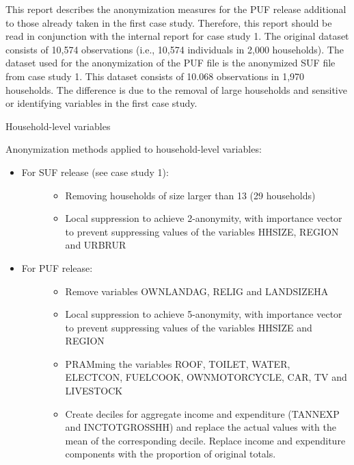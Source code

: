 \documentclass[letterpaper,10pt,english]{sphinxmanual}
\begin{document}
This report describes the anonymization measures for the PUF release additional to those already taken in the first case study. Therefore, this report should be read in conjunction with the internal report for case study 1. The original dataset consists of 10,574 observations (i.e., 10,574 individuals in 2,000 households). The dataset used for the anonymization of the PUF file is the anonymized SUF file from case study 1. This dataset consists of 10.068 observations in 1,970 households. The difference is due to the removal of large households and sensitive or identifying variables in the first case study.

Household-level variables

Anonymization methods applied to household-level variables:
\begin{itemize}
\item {} \begin{description}
\item[{For SUF release (see case study 1):}] \leavevmode\begin{itemize}
\item {} 
Removing households of size larger than 13 (29 households)

\item {} 
Local suppression to achieve 2-anonymity, with importance vector to prevent suppressing values of the variables HHSIZE, REGION and URBRUR

\end{itemize}

\end{description}

\item {} \begin{description}
\item[{For PUF release:}] \leavevmode\begin{itemize}
\item {} 
Remove variables OWNLANDAG, RELIG and LANDSIZEHA

\item {} 
Local suppression to achieve 5-anonymity, with importance vector to prevent suppressing values of the variables HHSIZE and REGION

\item {} 
PRAMming the variables ROOF, TOILET, WATER, ELECTCON, FUELCOOK, OWNMOTORCYCLE, CAR, TV and LIVESTOCK

\item {} 
Create deciles for aggregate income and expenditure (TANNEXP and INCTOTGROSSHH) and replace the actual values with the mean of the corresponding decile. Replace income and expenditure components with the proportion of original totals.

\end{itemize}

\end{description}

\end{itemize}
\end{document}
